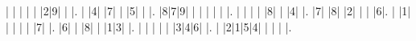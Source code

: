 \begin{sudoku-block}| | | | | |2|9| | |.
| |4| |7| | |5| | |.
|8|7|9| | | | | | |.
| | | | |8| | |4| |.
|7| |8| |2| | | |6|.
| |1| | | | | |7| |.
|6| | |8| | |1|3| |.
| | | | | |3|4|6| |.
| |2|1|5|4| | | | |.
\end{sudoku-block}